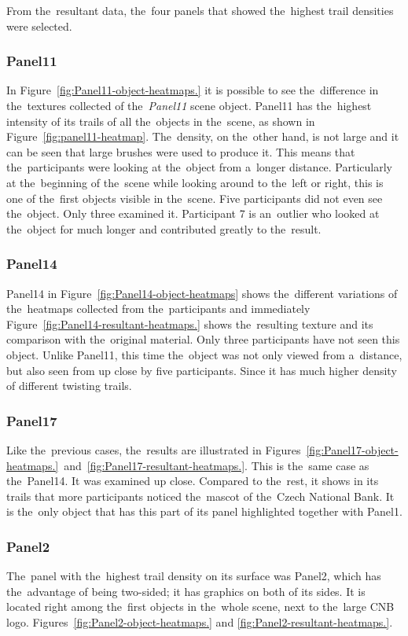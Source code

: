 From the~resultant data, the~four panels that showed the~highest trail densities were selected.

\subsubsection*{Panel11}
In Figure~\ref{fig:Panel11-object-heatmaps.} it is possible to see the~difference in the~textures collected of the~\emph{Panel11} scene object.
Panel11 has the~highest intensity of its trails of all the~objects in the~scene, as shown in Figure~\ref{fig:panel11-heatmap}. The~density, on the~other hand, is not large and it can be seen that large brushes were used to produce it. This means that the~participants were looking at the~object from a~longer distance. Particularly at the~beginning of the~scene while looking around to the~left or right, this is one of the~first objects visible in the~scene. 
Five participants did not even see the~object. Only three examined it. Participant 7 is an~outlier who looked at the~object for much longer and contributed greatly to the~result. 

\subsubsection*{Panel14}
Panel14 in Figure~\ref{fig:Panel14-object-heatmaps} shows the~different variations of the~heatmaps collected from the~participants and immediately Figure~\ref{fig:Panel14-resultant-heatmaps.} shows the~resulting texture and its comparison with the~original material. Only three participants have not seen this object. Unlike Panel11, this time the~object was not only viewed from a~distance, but also seen from up close by five participants. Since it has much higher density of different twisting trails.

\subsubsection*{Panel17}
Like the~previous cases, the~results are illustrated in Figures~\ref{fig:Panel17-object-heatmaps.}~and~\ref{fig:Panel17-resultant-heatmaps.}. This is the~same case as the~Panel14. It was examined up close. Compared to the~rest, it shows in its trails that more participants noticed the~mascot of the~Czech National Bank. It is the~only object that has this part of its panel highlighted together with Panel1.

\subsubsection*{Panel2}
The~panel with the~highest trail density on its surface was Panel2, which has the~advantage of being two-sided; it has graphics on both of its sides. It is located right among the~first objects in the~whole scene, next to the~large CNB logo. Figures~\ref{fig:Panel2-object-heatmaps.} and \ref{fig:Panel2-resultant-heatmaps.}.

